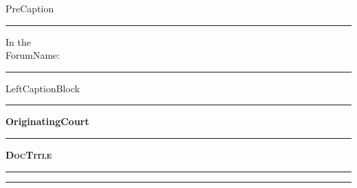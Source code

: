 \documentclass{article}
\begin{document}
\setlength\extrarowheight{12pt}%
\newlength{\ldhalfwd}
%

\def\ol{%
  \begin{longtable}{p{\ldhalfwd}p{\ldhalfwd}}%
    \parbox[t]{\ldhalfwd}{
      \textsc{Daniel E. Doherty}\\
Commerce Plaza I\\
7300 W. 110th Street, Suite 930\\
Overland Park, KS 66210\\
\textbf{Phone:} 913-338-7182\\
\textbf{Fax:} 913-338-7164\\
\textbf{Email:} \texttt{ded-law@ddoherty.net}\\
Attorney for Lisa A. Gibbons and Revive Investing LLC
    }&
    \parbox[t]{\ldhalfwd}{
      \textsc{Charles J. Hyland}\\
Commerce Plaza I\\
7300 W. 110th Street, Suite 930\\
Overland Park, KS 66210\\
\textsc{Hyland Law Firm LLC}\\
\textbf{Phone:} 913-498-1911\\
\textbf{Fax:} 913-498-1950\\
\textbf{Email:} \texttt{charlie@hylandkc.com}\\
Attorney for Lisa A. Gibbons and Revive Investing LLC
    }\\
  \end{longtable}
}

  \thispagestyle{empty}
  \setcounter{page}{-1}
  {PreCaption}
  \begin{center}
    \hrule
    \vspace{10pt}
    \vfil
    {\Large\gothfamily In th{e}\\
      {\LARGE ForumName:}}
    \vfil
    \hrule
    \vfil
    LeftCaptionBlock
    \vfil
    \hrule
    \vfil
    \textbf{OriginatingCourt}
    \vfil
    \hrule
    \vfil
    \textsc{\bfseries DocTitle}
    \vfil
    \hrule
    \vfil
    \begin{singlespace}
      \mbox{\ol}
    \end{singlespace}
    \vfil
    \vspace{10pt}
    \hrule
  \end{center}
  \clearpage
\end{document}
